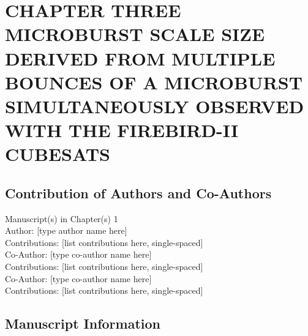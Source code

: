 

\chapter{CHAPTER THREE \\ MICROBURST SCALE SIZE DERIVED FROM MULTIPLE BOUNCES OF A MICROBURST SIMULTANEOUSLY OBSERVED WITH THE FIREBIRD-II CUBESATS} \label{CH:bouncing_packet}

\section{Contribution of Authors and Co-Authors} 
\noindent Manuscript(s) in Chapter(s) 1 \\ 

\noindent Author: [type author name here] \\
Contributions: [list contributions here, single-spaced] \\
Co-Author: [type co-author name here] \\
Contributions: [list contributions here, single-spaced] \\
Co-Author: [type co-author name here] \\
Contributions: [list contributions here, single-spaced] \\

\iffalse
\authors{Mykhaylo Shumko\affil{1}, John Sample\affil{1}, Arlo Johnson\affil{1}, Bern Blake\affil{2}, Alex Crew\affil{3}, Harlan Spence\affil{4}, David Klumpar\affil{1}, Oleksiy Agapitov\affil{5}, Matthew Handley\affil{1}}

\affiliation{1}{Department of Physics, Montana State University, Bozeman, Montana, USA}
\affiliation{2}{Space Science Applications Laboratory, The Aerospace Corporation, Los Angeles, California, USA}
\affiliation{3}{The Johns Hopkins University Applied Physics Laboratory LLC, Laurel, Maryland, USA}
\affiliation{4}{Institute for the Study of Earth, Oceans, and Space, University of New Hampshire, Durham, New Hampshire, USA}
\affiliation{5}{Space Sciences Laboratory, UC Berkeley, Berkeley, California, USA}
\fi

\newpage




\section{Manuscript Information}

